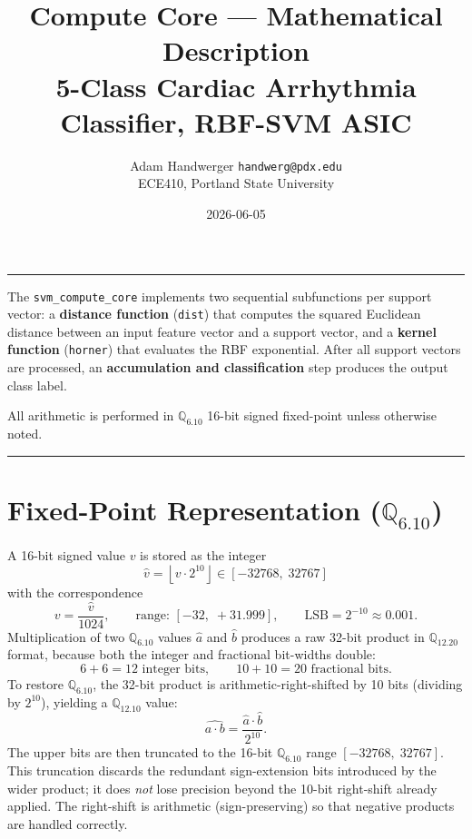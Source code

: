 \documentclass[11pt]{article}
\title{\textbf{Compute Core --- Mathematical Description}\\[0.4em]
       \large 5-Class Cardiac Arrhythmia Classifier, RBF-SVM ASIC}
\author{Adam Handwerger \quad \texttt{handwerg@pdx.edu}\\
        ECE410, Portland State University}
\date{2026-06-05}
\begin{document}
\maketitle
\noindent\rule{\linewidth}{0.5pt}

\vspace{0.3em}
The \texttt{svm\_compute\_core} implements two sequential subfunctions per support
vector: a \textbf{distance function} (\texttt{dist}) that computes the squared
Euclidean distance between an input feature vector and a support vector, and a
\textbf{kernel function} (\texttt{horner}) that evaluates the RBF exponential.
After all support vectors are processed, an \textbf{accumulation and classification}
step produces the output class label.

All arithmetic is performed in \(\mathbb{Q}_{6.10}\) 16-bit signed fixed-point
unless otherwise noted.

\vspace{0.5em}
\noindent\rule{\linewidth}{0.3pt}

\section{Fixed-Point Representation (\(\mathbb{Q}_{6.10}\))}

A 16-bit signed value \(v\) is stored as the integer
\[
    \hat{v} = \left\lfloor v \cdot 2^{10} \right\rfloor \in [-32768,\; 32767]
\]
with the correspondence
\[
    v = \frac{\hat{v}}{1024}, \qquad
    \text{range: } [-32,\; +31.999], \qquad
    \text{LSB} = 2^{-10} \approx 0.001.
\]
Multiplication of two \(\mathbb{Q}_{6.10}\) values \(\hat{a}\) and \(\hat{b}\)
produces a raw 32-bit product in \(\mathbb{Q}_{12.20}\) format, because both the
integer and fractional bit-widths double:
\[
    6 + 6 = 12 \text{ integer bits}, \qquad 10 + 10 = 20 \text{ fractional bits}.
\]
To restore \(\mathbb{Q}_{6.10}\), the 32-bit product is arithmetic-right-shifted by
10 bits (dividing by \(2^{10}\)), yielding a \(\mathbb{Q}_{12.10}\) value:
\[
    \widehat{a \cdot b} = \frac{\hat{a} \cdot \hat{b}}{2^{10}}.
\]
The upper bits are then truncated to the 16-bit \(\mathbb{Q}_{6.10}\) range
\([-32768,\; 32767]\). This truncation discards the redundant sign-extension bits
introduced by the wider product; it does \emph{not} lose precision beyond the
10-bit right-shift already applied. The right-shift is arithmetic (sign-preserving)
so that negative products are handled correctly.
\end{document}
